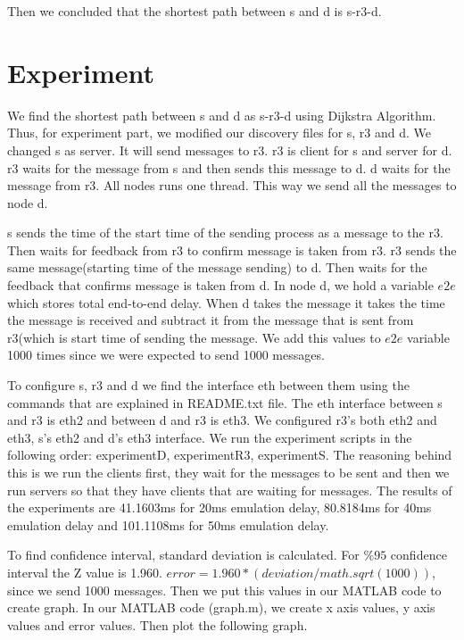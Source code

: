 \documentclass[conference]{IEEEtran}
\begin{document}
Then we concluded that the shortest path between s and d is s-r3-d.
\section{Experiment}
We find the shortest path between s and d as s-r3-d using Dijkstra Algorithm. Thus, for experiment part, we modified our discovery files for s, r3 and d. We changed s as server. It will send messages to r3. r3 is client for s and server for d. r3 waits for the message from s and then sends this message to d. d waits for the message from r3. All nodes runs one thread. This way we send all the messages to node d. 

s sends the time of the start time of the sending process as a message to the r3. Then waits for feedback from r3 to confirm message is taken from r3. r3 sends the same message(starting time of the message sending) to d. Then waits for the feedback that confirms message is taken from d. In node d, we hold a variable $e2e$ which stores total end-to-end delay. When d takes the message it takes the time the message is received and subtract it from the message that is sent from r3(which is start time of sending the message. We add this values to $e2e$ variable 1000 times since we were expected to send 1000 messages.

To configure s, r3 and d we find the interface eth between them using the commands that are explained in README.txt file. The eth interface between s and r3 is eth2 and between d and r3 is eth3. We configured r3's both eth2 and eth3, s's eth2 and d's eth3 interface. We run the experiment scripts in the following order: experimentD, experimentR3, experimentS. The reasoning behind this is we run the clients first, they wait for the messages to be sent and then we run servers so that they have clients that are waiting for messages. The results of the experiments are 41.1603ms for 20ms emulation delay, 80.8184ms for 40ms emulation delay and 101.1108ms for 50ms emulation delay. 

To find confidence interval, standard deviation is calculated. For $\%95$ confidence interval the Z value is 1.960. $error = 1.960 * (deviation / math.sqrt(1000))$, since we send 1000 messages. Then we put this values in our MATLAB code to create graph. In our MATLAB code (graph.m), we create x axis values, y axis values and error values. Then plot the following graph.
\end{document}
